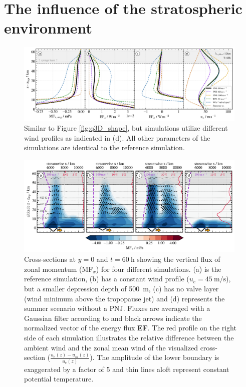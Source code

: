 \section{The influence of the stratospheric environment}
\label{sec:q3D-wind}
\begin{figure}[t]
    \centering
    \includegraphics[width=0.99\textwidth]{figures_q3D/TD-zprofiles-translbq3D_wind-T60h-avg.png}
    \caption{Similar to Figure \ref{fig:q3D_shape}, but simulations utilize different wind profiles as indicated in (d). All other parameters of the simulations are identical to the reference simulation.}
    \label{fig:q3D_wind}
\end{figure}
%
\begin{figure}[t]
    \centering
    \includegraphics[width=0.99\textwidth]{figures_q3D/Q3D-MFx-towers.png}
    \caption{Cross-sections at $y=0$ and $t=\SI{60}{\hour}$ showing the vertical flux of zonal momentum (MF$_x$) for four different simulations. (a) is the reference simulation, (b) has a constant wind profile ($u_e=\SI{45}{\meter\per\second}$), but a smaller depression depth of \SI{500}{\meter}, (c) has no valve layer (wind minimum above the tropopause jet) and (d) represents the summer scenario without a PNJ. Fluxes are averaged with a Gaussian filter according to \textcite[]{kruse_gravity_2015} and black arrows indicate the normalized vector of the energy flux \textbf{EF}. The red profile on the right side of each simulation illustrates the relative difference between the ambient wind and the zonal mean wind of the visualized cross-section ($\frac{u_e(z)-u_m(z)}{u_e(z)}$). The amplitude of the lower boundary is exaggerated by a factor of 5 and thin lines aloft represent constant potential temperature.}
    \label{fig:q3D-mfx-towers}
\end{figure}
